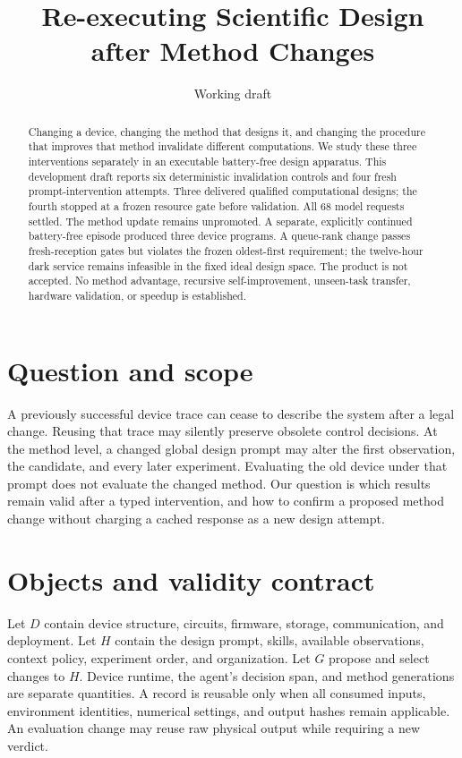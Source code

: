 \documentclass[10pt]{article}
\title{Re-executing Scientific Design\\after Method Changes}
\author{Working draft}
\date{}
\begin{document}
\maketitle
\begin{abstract}
Changing a device, changing the method that designs it, and changing the procedure
that improves that method invalidate different computations. We study these three
interventions separately in an executable battery-free design apparatus. This
development draft reports six deterministic invalidation controls and four fresh
prompt-intervention attempts. Three delivered qualified computational designs; the
fourth stopped at a frozen resource gate before validation. All 68 model requests
settled. The method update remains unpromoted. A separate, explicitly continued
battery-free episode produced three device programs. A queue-rank change passes
fresh-reception gates but violates the frozen oldest-first requirement; the
twelve-hour dark service remains infeasible in the fixed ideal design space.
The product is not accepted. No method advantage, recursive self-improvement,
unseen-task transfer, hardware validation, or speedup is established.
\end{abstract}

\section{Question and scope}
A previously successful device trace can cease to describe the system after a
legal change. Reusing that trace may silently preserve obsolete control decisions.
At the method level, a changed global design prompt may alter the first observation,
the candidate, and every later experiment. Evaluating the old device under that
prompt does not evaluate the changed method. Our question is which results remain
valid after a typed intervention, and how to confirm a proposed method change
without charging a cached response as a new design attempt.

\section{Objects and validity contract}
Let $D$ contain device structure, circuits, firmware, storage, communication, and
deployment. Let $H$ contain the design prompt, skills, available observations,
context policy, experiment order, and organization. Let $G$ propose and select
changes to $H$. Device runtime, the agent's decision span, and method generations
are separate quantities. A record is reusable only when all consumed inputs,
environment identities, numerical settings, and output hashes remain applicable.
An evaluation change may reuse raw physical output while requiring a new verdict.
\end{document}
